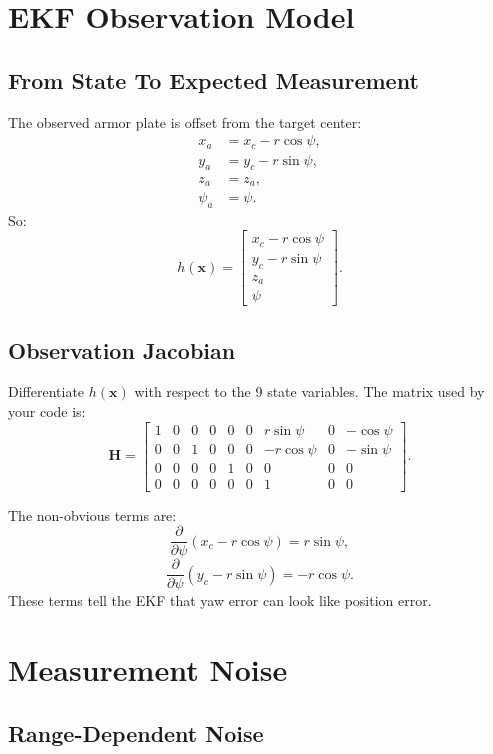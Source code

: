 \documentclass[11pt,a4paper]{article}
\newcommand{\vect}[1]{\bm{#1}}
\newcommand{\mat}[1]{\mathbf{#1}}
\begin{document}
\section{EKF Observation Model}

\subsection{From State To Expected Measurement}

The observed armor plate is offset from the target center:
\[
\begin{aligned}
x_a &= x_c-r\cos\psi,\\
y_a &= y_c-r\sin\psi,\\
z_a &= z_a,\\
\psi_a &= \psi.
\end{aligned}
\]
So:
\[
h(\vect{x}) =
\begin{bmatrix}
x_c-r\cos\psi\\
y_c-r\sin\psi\\
z_a\\
\psi
\end{bmatrix}.
\]

\subsection{Observation Jacobian}

Differentiate \(h(\vect{x})\) with respect to the 9 state variables.
The matrix used by your code is:
\[
\mat{H} =
\begin{bmatrix}
1&0&0&0&0&0&r\sin\psi&0&-\cos\psi\\
0&0&1&0&0&0&-r\cos\psi&0&-\sin\psi\\
0&0&0&0&1&0&0&0&0\\
0&0&0&0&0&0&1&0&0
\end{bmatrix}.
\]

The non-obvious terms are:
\[
\frac{\partial}{\partial\psi}(x_c-r\cos\psi)=r\sin\psi,
\]
\[
\frac{\partial}{\partial\psi}(y_c-r\sin\psi)=-r\cos\psi.
\]
These terms tell the EKF that yaw error can look like position error.

\section{Measurement Noise}

\subsection{Range-Dependent Noise}
\end{document}
